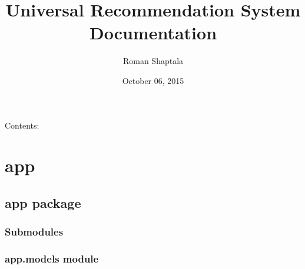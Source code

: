 \documentclass[letterpaper,10pt,english]{sphinxmanual}
\title{Universal Recommendation System Documentation}
\date{October 06, 2015}
\author{Roman Shaptala}
\begin{document}
\maketitle
\tableofcontents
{}\label{index::doc}


Contents:


\part{app}
\label{modules:welcome-to-universal-recommendation-system-s-documentation}\label{modules:app}\label{modules::doc}

\chapter{app package}
\label{app:app-package}\label{app::doc}

\section{Submodules}
\label{app:submodules}

\section{app.models module}
\label{app:module-app.models}\label{app:app-models-module}
\end{document}
